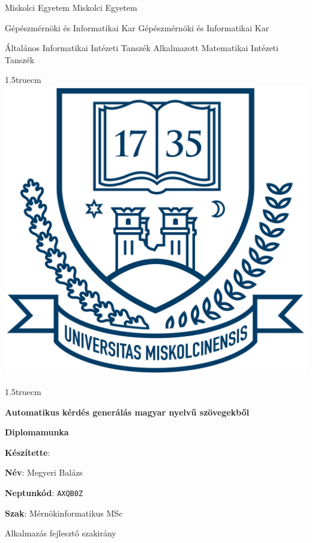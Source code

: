 \pagestyle{empty}

{\small
Miskolci Egyetem \hfill Miskolci Egyetem

Gépészmérnöki és Informatikai Kar \hfill Gépészmérnöki és Informatikai Kar

Általános Informatikai Intézeti Tanszék \hfill \hfill Alkalmazott Matematikai Intézeti Tanszék}

{\large
\begin{center}
\vglue 1.5truecm
\includegraphics[scale=0.15]{images/me_logo.png}\\
\end{center}}

\vglue 1.5truecm

{\huge
\begin{center}
\textbf{Automatikus kérdés generálás magyar nyelvű szövegekből}
\end{center}}

\vspace*{1cm}

\begin{center}
\LARGE \textbf{Diplomamunka}
\end{center}

\vspace*{2.5truecm}

{\large
\hspace{6.5cm} \textbf{Készítette}:


\hspace{6.5cm} \textbf{Név}: Megyeri Balázs


\hspace{6.5cm} \textbf{Neptunkód}: \texttt{AXQB0Z}


\hspace{6.5cm} \textbf{Szak}: Mérnökinformatikus MSc


\hspace{6.5cm} Alkalmazás fejlesztő szakirány
}

\newpage
